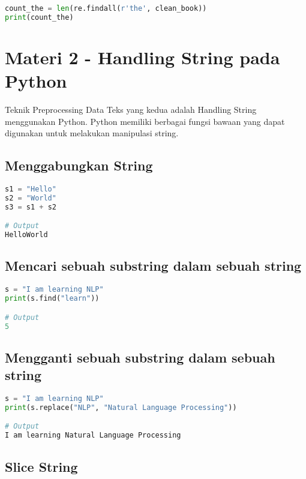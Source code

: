 \documentclass{article}
\begin{document}
    \begin{lstlisting}[language=python, style=pythonstyle]
count_the = len(re.findall(r'the', clean_book))
print(count_the)
    \end{lstlisting}

    \section*{Materi 2 \@- Handling String pada Python}

    Teknik Preprocessing Data Teks yang kedua adalah Handling String menggunakan Python.
    Python memiliki berbagai fungsi bawaan yang dapat digunakan untuk melakukan manipulasi string.

    \subsection*{Menggabungkan String}

    \begin{lstlisting}[language=python, style=pythonstyle]
s1 = "Hello"
s2 = "World"
s3 = s1 + s2

# Output
HelloWorld
    \end{lstlisting}

    \subsection*{Mencari sebuah substring dalam sebuah string}

    \begin{lstlisting}[language=python, style=pythonstyle]
s = "I am learning NLP"
print(s.find("learn"))

# Output
5
    \end{lstlisting}

    \subsection*{Mengganti sebuah substring dalam sebuah string}

    \begin{lstlisting}[language=python, style=pythonstyle]
s = "I am learning NLP"
print(s.replace("NLP", "Natural Language Processing"))

# Output
I am learning Natural Language Processing
    \end{lstlisting}

    \subsection*{Slice String}
\end{document}
